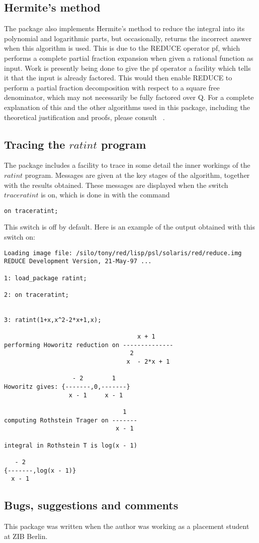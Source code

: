 \subsection{Hermite's method}
The package also implements Hermite's method to reduce the integral into its polynomial and logarithmic parts, but occasionally, \REDUCE returns the incorrect answer when this algorithm is used. This is due to the REDUCE operator pf, which performs a complete partial fraction expansion when given a rational function as input. Work is presently being done to give the pf operator a facility which tells it that the input is already factored. This would then enable REDUCE to perform a partial fraction decomposition with respect to a square free denominator, which may not necessarily be fully factored over Q. 
\newline
For a complete explanation of this and the other algorithms used in this package, including the theoretical justification and proofs, please consult ~\cite{Geddes:92}.

\subsection{Tracing the $ratint$ program}
The package includes a facility to trace in some detail the inner workings of the $ratint$ program. Messages are given at the key stages of the algorithm, together with the results obtained. These messages are displayed when the switch $traceratint$ is on, which is done in \REDUCE with the command 
\begin{verbatim}
on traceratint;
\end{verbatim}
This switch is off by default. Here is an example of the output obtained with this switch on:

\begin{verbatim}
Loading image file: /silo/tony/red/lisp/psl/solaris/red/reduce.img
REDUCE Development Version, 21-May-97 ...

1: load_package ratint;

2: on traceratint;


3: ratint(1+x,x^2-2*x+1,x);

                                     x + 1
performing Howoritz reduction on --------------
                                   2
                                  x  - 2*x + 1

                   - 2        1
Howoritz gives: {-------,0,-------}
                  x - 1     x - 1

                                 1
computing Rothstein Trager on -------
                               x - 1

integral in Rothstein T is log(x - 1)

   - 2
{-------,log(x - 1)}
  x - 1

\end{verbatim}

\subsection{Bugs, suggestions and comments}
This package was written when the author was working as a placement student at ZIB Berlin.

